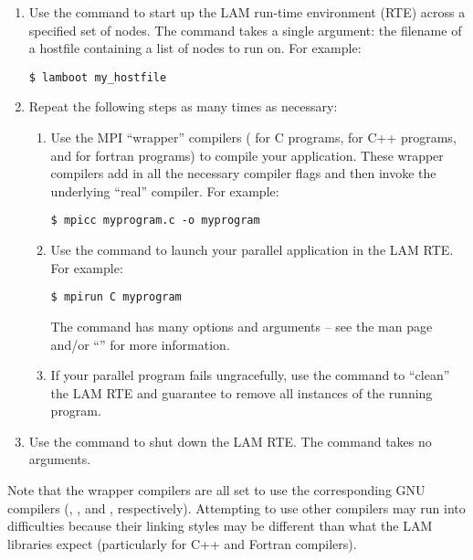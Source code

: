 \begin{enumerate}
\item Use the  command to start up the LAM run-time
  environment (RTE) across a specified set of nodes.  The
   command takes a single argument: the filename of a
  hostfile containing a list of nodes to run on.  For example:

\begin{verbatim}
$ lamboot my_hostfile
\end{verbatim}

\item Repeat the following steps as many times as necessary:

  \begin{enumerate}
  \item Use the MPI ``wrapper'' compilers ( for C programs,
     for C++ programs, and  for fortran
    programs) to compile your application.  These wrapper compilers
    add in all the necessary compiler flags and then invoke the
    underlying ``real'' compiler.  For example:
    
\begin{verbatim}
$ mpicc myprogram.c -o myprogram
\end{verbatim}
    
  \item Use the  command to launch your parallel
    application in the LAM RTE.  For example:

\begin{verbatim}
$ mpirun C myprogram
\end{verbatim}
    
    The  command has many options and arguments -- see the
    man page and/or ``'' for more information.

  \item If your parallel program fails ungracefully, use the
     command to ``clean'' the LAM RTE and guarantee to
    remove all instances of the running program.

  \end{enumerate}

\item Use the  command to shut down the LAM RTE.  The
   command takes no arguments.
\end{enumerate}

Note that the wrapper compilers are all set to use the corresponding
GNU compilers (, , and , respectively).
Attempting to use other compilers may run into difficulties because
their linking styles may be different than what the LAM libraries
expect (particularly for C++ and Fortran compilers).

